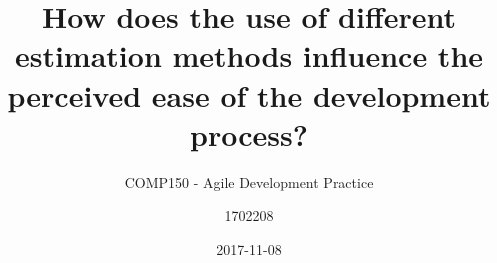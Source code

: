 \documentclass{scrartcl}
\title{How does the use of different estimation methods influence the perceived ease of the development process?}
\subtitle{COMP150 - Agile Development Practice}
\author{1702208}
\date{2017-11-08}
\begin{document}
\maketitle{}

\newpage{}







\end{document}
